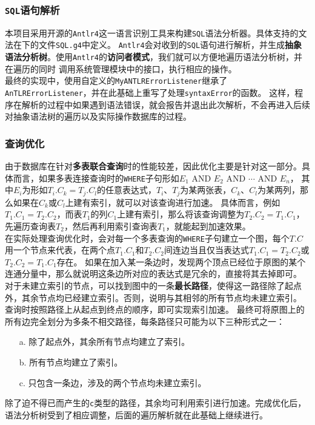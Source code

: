 \documentclass[11pt]{article}
\begin{document}
\subsubsection{\texttt{SQL}语句解析}
本项目采用开源的\texttt{Antlr4}这一语言识别工具来构建\texttt{SQL}语法分析器。具体支持的文法在下的文件\texttt{SQL.g4}中定义。
\texttt{Antlr4}会对收到的\texttt{SQL}语句进行解析，并生成\textbf{抽象语法分析树}。使用\texttt{Antlr4}的\textbf{访问者模式}，我们就可以方便地遍历语法分析树，并在遍历的同时
调用系统管理模块中的接口，执行相应的操作。\\

最终的实现中，使用自定义的\texttt{MyANTLRErrorListener}继承了\texttt{AnTLRErrorListener}，并在此基础上重写了处理\texttt{syntaxError}的函数。
这样，程序在解析的过程中如果遇到语法错误，就会报告并退出此次解析，不会再进入后续对抽象语法树的遍历以及实际操作数据库的过程。

\subsubsection{查询优化}
由于数据库在针对\textbf{多表联合查询}时的性能较差，因此优化主要是针对这一部分。具体而言，如果多表连接查询时的\texttt{WHERE}子句形如$E_1 \text{ AND } E_2 \text{ AND } \cdots \text{ AND } E_n$，
其中$E_i$为形如$T_i.C_k=T_j.C_l$的任意表达式，$T_i$、$T_j$为某两张表，$C_k$、$C_l$为某两列，那么如果在$C_k$或$C_l$上建有索引，就可以对该查询进行加速。
具体而言，例如$T_1.C_1=T_2.C_2$，而表$T_1$的列$C_1$上建有索引，那么将该查询调整为$T_2.C_2=T_1.C_1$，先遍历查询表$T_2$，然后再利用索引查询表$T_1$，就能起到加速效果。\\

在实际处理查询优化时，会对每一个多表查询的\texttt{WHERE}子句建立一个图，每个$T.C$用一个节点来代表，在两个点$T_1.C_1$和$T_2.C_2$间连边当且仅当表达式$T_1.C_1=T_2.C_2$或$T_2.C_2=T_1.C_1$存在。
如果在加入某一条边时，发现两个顶点已经位于原图的某个连通分量中，那么就说明这条边所对应的表达式是冗余的，直接将其去掉即可。\\

对于未建立索引的节点，可以找到图中的一条\textbf{最长路径}，使得这一路径除了起点外，其余节点均已经建立索引。否则，说明与其相邻的所有节点均未建立索引。
查询时按照路径上从起点到终点的顺序，即可实现索引加速。
最终可将原图上的所有边完全划分为多条不相交路径，每条路径只可能为以下三种形式之一：
\begin{enumerate}
    \item[a.] 除了起点外，其余所有节点均建立了索引。
    \item[b.] 所有节点均建立了索引。
    \item[c.] 只包含一条边，涉及的两个节点均未建立索引。
\end{enumerate}
除了迫不得已而产生的\texttt{c}类型的路径，其余均可利用索引进行加速。完成优化后，语法分析树受到了相应调整，后面的遍历解析就在此基础上继续进行。
\end{document}
